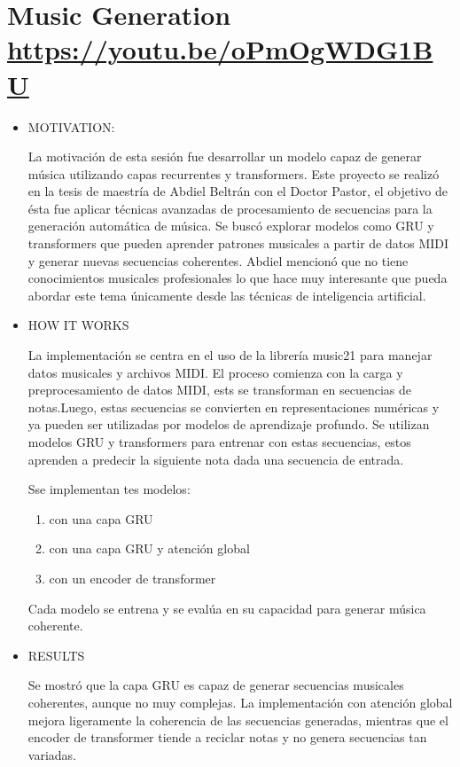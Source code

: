\documentclass[letter, 11pt, twoside]{report}
\begin{document}
\section*{Music Generation \color{mirosa}\url{https://youtu.be/oPmOgWDG1BU}}
\begin{itemize}
    \item MOTIVATION:
    
    La motivación de esta sesión fue desarrollar un modelo capaz de generar música utilizando capas recurrentes y transformers. Este proyecto se realizó en la tesis de maestría de Abdiel Beltrán con el Doctor Pastor, el objetivo de ésta fue aplicar técnicas avanzadas de procesamiento de secuencias para la generación automática de música. Se buscó explorar  modelos como GRU y transformers que pueden aprender patrones musicales a partir de datos MIDI y generar nuevas secuencias coherentes. Abdiel mencionó que no tiene conocimientos musicales profesionales lo que hace muy interesante que pueda abordar este tema únicamente desde las técnicas de inteligencia artificial.
    \item HOW IT WORKS
    
    La implementación se centra en el uso de la librería music21 para manejar datos musicales y archivos MIDI. El proceso comienza con la carga y preprocesamiento de datos MIDI, ests se transforman en secuencias de notas.Luego, estas secuencias se convierten en representaciones numéricas y ya pueden ser utilizadas por modelos de aprendizaje profundo. Se utilizan modelos GRU y transformers para entrenar con estas secuencias, estos aprenden a predecir la siguiente nota dada una secuencia de entrada. 
    
    Sse implementan tes modelos:
    
    \begin{enumerate}
        \item con una capa GRU
        \item con una capa GRU y atención global
        \item con un encoder de transformer
    \end{enumerate}
    Cada modelo se entrena y se evalúa en su capacidad para generar música coherente.
    \item RESULTS
    
    Se mostró que la capa GRU es capaz de generar secuencias musicales coherentes, aunque no muy complejas. 
    La implementación con atención global mejora ligeramente la coherencia de las secuencias generadas, mientras que el encoder de transformer tiende a reciclar notas y no genera secuencias tan variadas. 
    

\end{itemize}
\end{document}
